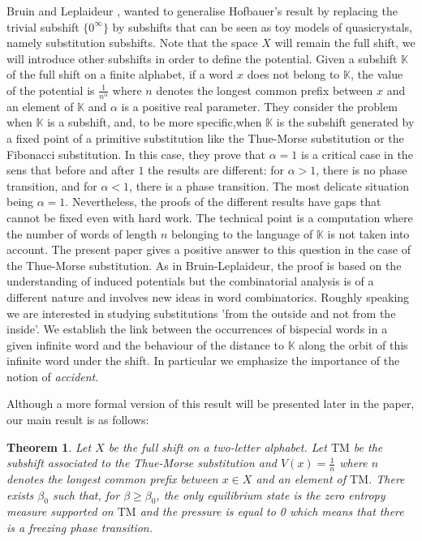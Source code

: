 \documentclass[11 pt]{article}
\newtheorem*{theoNoNum}{Theorem}
\def\K{{\mathbb K}}
\theoremstyle{definition}
\begin{document}
 Bruin and Leplaideur \cite{BL2}, \cite{Bruin-Leplaid-13} wanted to generalise Hofbauer's result by replacing the trivial subshift $\{0^\infty\}$ by subshifts that can be seen as toy models of quasicrystals, namely substitution subshifts. Note that the space $X$ will remain the full shift, we will introduce other subshifts in order to define the potential. Given a subshift 
$\K$ of the full shift on a finite alphabet, if a word $x$ does not belong to $\K$, the value of the potential is $\frac{1}{n^\alpha}$ where $n$ denotes the longest common prefix between $x$ and an element of $\K$ and $\alpha$ is a positive real parameter.
They consider the problem when $\K$ is a subshift, and, to be more specific,when $\K$ is the subshift generated by a fixed point of a primitive substitution like the Thue-Morse substitution or the Fibonacci substitution. In this case, they prove that $\alpha = 1$ is a critical case in the sens that before and after $1$ the results are different: for $\alpha > 1$, there is no phase transition, and for $\alpha< 1$, there is a phase transition. The most delicate situation being $\alpha = 1$. Nevertheless, the proofs of the different results have gaps that cannot be fixed even with hard work. The technical point is a computation where the number of words of length $n$ belonging to the language of $\K$ is not taken into account. The present paper gives a positive answer to this question in the case of the Thue-Morse substitution. As in Bruin-Leplaideur, the proof is based on the understanding of induced potentials but the combinatorial analysis is of a different nature and involves new ideas in word combinatorics. Roughly speaking we are interested in studying substitutions 'from the outside and not from the inside'. We establish the link between
the occurrences of bispecial words in a given infinite word and the behaviour of the distance to $\K$ along the orbit of this infinite word under the shift. In particular we emphasize the importance of the notion of {\it accident}.


Although a more formal version of this result will be presented later in the paper, our main result is as follows:
\begin{theoNoNum}
Let $X$ be the full shift on a two-letter alphabet. Let $\mathrm{TM}$ be the subshift associated to the Thue-Morse substitution and $V(x) = \frac{1}{n}$ where $n$ denotes the longest common prefix between $x\in X$ and an element of $\mathrm{TM}$. There exists $\beta_0$ such that, for $\beta \geq \beta_0$, the only equilibrium state is the zero entropy measure supported  on $\mathrm{TM}$ and the pressure is equal to 0 which means that there is a freezing phase transition. 
\end{theoNoNum}
\end{document}

